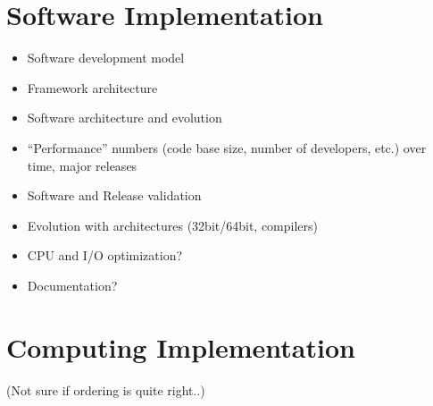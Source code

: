 \documentclass [draft,notitlepage] {article}
\begin{document}
\section{Software Implementation}
\begin{itemize}

\item Software development model

\item Framework architecture 

\item Software architecture and evolution

\item ``Performance'' numbers (code base size, number of developers, etc.) 
over time, major releases

\item Software and Release validation

\item Evolution with architectures (32bit/64bit, compilers)

\item CPU and I/O optimization?

\item Documentation?

\end{itemize}


\section{Computing Implementation} 
(Not sure if ordering is quite right..)
\end{document}
